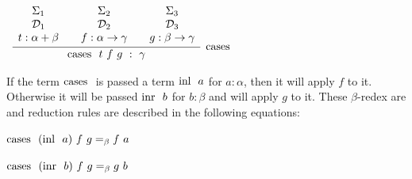 \documentclass{book}
\begin{document}
        \begin{center}
            $\begin{array}{ c }
	
                \infer[\sumElim]{\sumElim \ t \ f \ g \ : \ \gamma}
                    {
                    \begin{array}{c} \Sigma_{1}  \\ \mathcal{D}_{1} \\ t : \alpha + \beta \end{array}
                     & 
                    \begin{array}{c} \Sigma_{2}  \\ \mathcal{D}_{2} \\ f : \alpha\rightarrow\gamma \end{array}				
                     & 
                    \begin{array}{c} \Sigma_{3}  \\ \mathcal{D}_{3} \\ g : \beta\rightarrow\gamma \end{array}				 
                    }	
            
            \end{array}$            
        \end{center}
    
    
    If the term $\text{cases }$ is passed a term $\text{inl } \ a$ for $a : \alpha$, then it will apply $f$ to it. Otherwise it will be passed $\inr \ b$ for $b : \beta$ and will apply $g$ to it. These $\beta$-redex are and reduction rules are described in the following equations: 

    \begin{center}
      $\text{cases } \ (\text{inl } \ a) \ f \ g =_{\beta} f \ a$ 
  
      $\text{cases } \ (\text{inr } \ b) \ f \ g =_{\beta} g \ b$
    \end{center}
\end{document}
